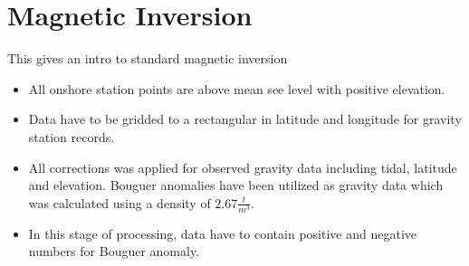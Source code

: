 \chapter{Magnetic Inversion}\label{Chp:cook:magnetic inversion}
This gives an intro to standard magnetic inversion


\begin{itemize}
\item All onshore station points are above mean see level with positive
elevation.

\item Data have to be gridded to a rectangular in latitude and longitude
for gravity station records.

\item All corrections was applied for observed gravity data including
tidal, latitude and elevation. Bouguer anomalies have been utilized as
gravity data which was calculated using a density of $2.67 \frac{t}{m^3}$.

\item In this stage of processing, data have to contain positive and
negative numbers for Bouguer anomaly.
\end{itemize}



